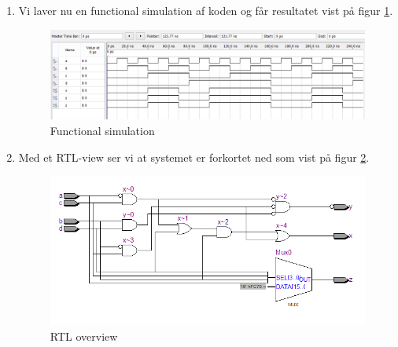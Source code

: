 \begin{enumerate}
	\item[2)]
	Vi laver nu en functional simulation af koden og får resultatet vist på figur \ref{fig:comVHDLFunSim}. 
		\begin{figure}[h]
			\centering
			\includegraphics[scale=0.6]{pictures/Oevelse4/combinational_VHDL_Func_sim.jpg}
			\caption{Functional simulation}
			\label{fig:comVHDLFunSim}
		\end{figure}
			\item[3)]
			Med et RTL-view ser vi at systemet er forkortet ned som vist på figur \ref{fig:comVHDLRTL}. 
			\begin{figure}[h]
				\centering
				\includegraphics[scale=0.6]{pictures/Oevelse4/combinational_VHDL_RTL.jpg}
				\caption{RTL overview}
				\label{fig:comVHDLRTL}
			\end{figure}
\end{enumerate}